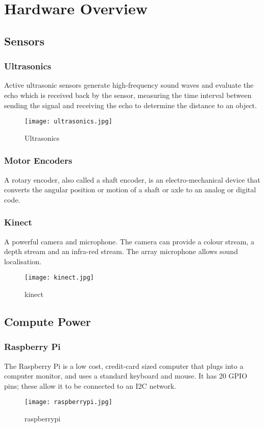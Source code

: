 \section{Hardware Overview}

\subsection{Sensors}
\subsubsection{Ultrasonics}
Active ultrasonic sensors generate high-frequency sound waves and evaluate the echo which is received back by the sensor, measuring the time interval between sending the signal and receiving the echo to determine the distance to an object.
\begin{figure}[!htb]
\begin{center}
\texttt{[image: ultrasonics.jpg]}
\end{center}
\caption{Ultrasonics}
\label{fig:Ultrasonics}
\end{figure}

\subsubsection{Motor Encoders}
A rotary encoder, also called a shaft encoder, is an electro-mechanical device that converts the angular position or motion of a shaft or axle to an analog or digital code. 

\subsubsection{Kinect}
A powerful camera and microphone. The camera can provide a colour stream, a depth stream and an infra-red stream. The array microphone allows sound localisation. 
\begin{figure}[!htb]
\begin{center}
\texttt{[image: kinect.jpg]}
\end{center}
\caption{kinect}
\label{fig:kinect}
\end{figure}

\subsection{Compute Power}
\subsubsection{Raspberry Pi}
The Raspberry Pi is a low cost, credit-card sized computer that plugs into a computer monitor, and uses a standard keyboard and mouse. It has 20 GPIO pins; these allow it to be connected to an I2C network. 
\begin{figure}[!htb]
\begin{center}
\texttt{[image: raspberrypi.jpg]}
\end{center}
\caption{raspberrypi}
\label{fig:raspberrypi}
\end{figure}


